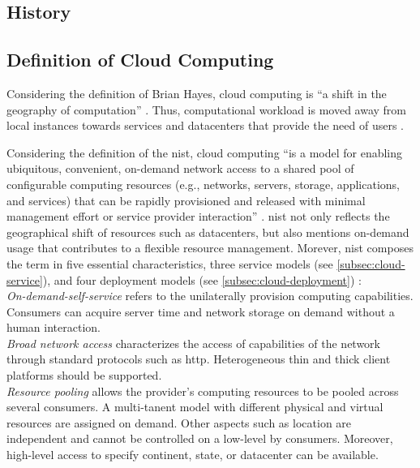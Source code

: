 \subsection{History}

\subsection{Definition of Cloud Computing}

Considering the definition of Brian Hayes, cloud computing is \enquote{a shift in the geography of computation} \cite{hayes2008}. Thus, computational workload is moved away from local instances towards services and datacenters that provide the need of users \cite{Armbrust2010}.

Considering the definition of the \ac{nist}, cloud computing \enquote{is a model for enabling ubiquitous, convenient, on-demand network access to a shared pool of configurable computing resources (e.g., networks, servers, storage, applications, and services) that can be rapidly provisioned and released with minimal management effort or service provider interaction} \cite{Mell2011}. \ac{nist} not only reflects the geographical shift of resources such as datacenters, but also mentions on-demand usage that contributes to a flexible resource management. Morever, \ac{nist} composes the term in five essential characteristics, three service models (see \autoref{subsec:cloud-service}), and four deployment models (see \autoref{subsec:cloud-deployment}) \cite{Mell2011}:\\

\textit{On-demand-self-service} refers to the unilaterally provision computing capabilities. Consumers can acquire server time and network storage on demand without a human interaction.\\

\textit{Broad network access} characterizes the access of capabilities of the network through standard protocols such as \ac{http}. Heterogeneous thin and thick client platforms should be supported.\\

\textit{Resource pooling} allows the provider's computing resources to be pooled across several consumers. A multi-tanent model with different physical and virtual resources are assigned on demand. Other aspects such as location are independent and cannot be controlled on a low-level by consumers. Moreover, high-level access to specify continent, state, or datacenter can be available.\\

